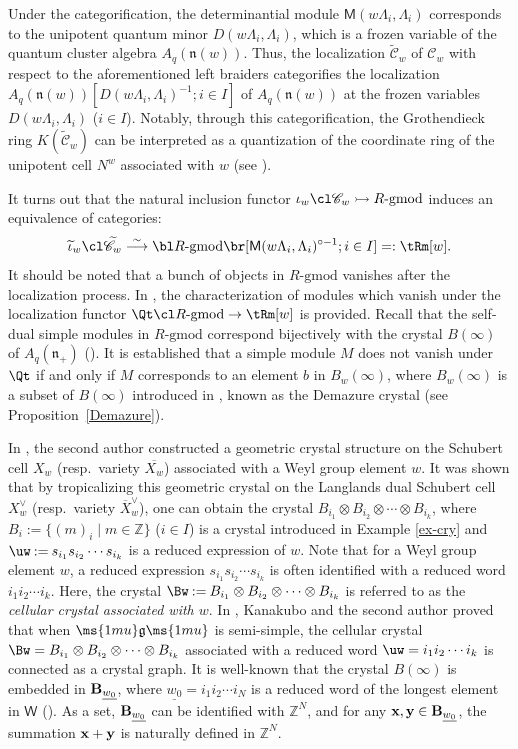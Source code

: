 \documentclass[12pt,leqno]{amsart}%
\theoremstyle{plain}
\theoremstyle{definition}
\newcommand{\seteq}{\mathbin{:=}}
\newcommand{\g}{\ms{1mu}\mathfrak{g}\ms{1mu}}
\newcommand{\n}{\mathfrak{n}}
\newcommand{\gmod}{\text{-}\mathrm{gmod}}
\newcommand{\weyl}{\mathsf{W}}  %
\newcommand\Aq[1][{\g^+}]{A_q(#1)}
\newcommand{\catC}{ \mathscr{C}}  	%
\newcommand{\tcatC}{ \widetilde{\mathscr{C}}}  	%
\newcommand{\dM}{ \mathsf{M }}              %
\newcommand{\La}{\Lambda} 			%
\newcommand{\bbZ}{\mathbb Z}
\numberwithin{equation}{section}
\begin{document}
Under the categorification, the determinantial module $\dM(w\La_i, \La_i)$ corresponds to the unipotent quantum minor $D(w\La_i, \La_i)$, which is a frozen variable of the quantum cluster algebra $A_q(\n(w))$. Thus, the localization $\tcatC_w$ of $\catC_w$ with respect to the aforementioned left braiders categorifies the localization $A_q(\n(w))[D(w\La_i, \La_i)^{-1}; i \in I]$ of $A_q(\n(w))$ at the frozen variables $D(w\La_i, \La_i)$ ($i \in I$). Notably, through this categorification, the Grothendieck ring $K(\tcatC_w)$ can be interpreted as a quantization of the coordinate ring of the unipotent cell $N^w$ associated with $w$ (see \cite[Theorem 4.13]{KO21}).

It turns out that the natural inclusion functor $\iota_w \cl \catC_w \rightarrowtail R\gmod$ induces an equivalence of categories:
$$
\widetilde \iota_w \cl  \tcatC_w \buildrel \sim \over \longrightarrow \bl R\gmod \br[\dM(w\La_i,\La_i)^{\circ -1}; i\in I]=:\tRm[w].
$$ 
It should be noted 
that a bunch of objects in $R\gmod$ vanishes after the localization process. 
In \cite[Proposition~3.3]{KKOP22},
the characterization of modules which vanish under the localization functor $\Qt \cl R\gmod \to \tRm[w]$ is provided. Recall that the self-dual simple modules in $R\gmod$ correspond bijectively with the crystal $B(\infty)$ of $\Aq[\n_+]$ (\cite{LV11}). It is established that a simple module $M$ does not vanish under $\Qt$ if and only if $M$ corresponds to an element $b$ in $B_w(\infty)$, where $B_w(\infty)$ is a subset of $B(\infty)$ introduced in \cite{Kas93}, known as the Demazure crystal (see Proposition~\ref{Demazure}).

In \cite{N1}, the second author constructed a geometric crystal structure on the Schubert cell $X_w$ 
(resp.\ variety $\overline{X_w}$) associated with a Weyl group element $w$. 
It was shown that by tropicalizing this geometric crystal on the Langlands dual Schubert cell $X^\vee_w$
(resp.\ variety $\overline{X}^\vee_w$), 
one can obtain the crystal $B_{i_1} \otimes B_{i_2} \otimes \cdots \otimes B_{i_k}$, 
where $B_i \seteq \{(m)_i \mid m \in \bbZ\}$ ($i \in I$) is a crystal introduced in Example \ref{ex-cry} 
and $\uw \seteq s_{i_1}s_{i_2} \cdots s_{i_k}$ is a reduced expression of $w$. 
Note that for a Weyl group element $w$, 
a reduced expression $s_{i_1}s_{i_2} \cdots s_{i_k}$ is often identified with a reduced word $i_1i_2 \cdots i_k$. Here, the crystal $\Bw \seteq B_{i_1} \otimes B_{i_2} \otimes \cdots \otimes B_{i_k}$ is 
referred to as the {\it cellular crystal associated with $w$}.
In \cite{Kana-N}, Kanakubo and the second author proved that when $\g$ is semi-simple, 
the cellular crystal $\Bw = B_{i_1} \otimes B_{i_2} \otimes \cdots \otimes B_{i_k}$ 
associated with a reduced word $\uw = i_1i_2 \cdots i_k$ is connected as a crystal graph. It is well-known
 that the crystal $B(\infty)$ is embedded in ${\bf B}_{\underline{w_0}}$, 
where $\underline{w_0} = i_1i_2 \cdots i_N$ is a reduced word of the longest element in $\weyl$ (\cite{Kana-N,N4}). 
As a set, ${\bf B}_{\underline{w_0}}$ can be identified with $\bbZ^N$, and for any ${\bf x, \bf y} \in {\bf B}_{\underline{w_0}}$, the summation ${\bf x} + {\bf y}$ is naturally defined in $\bbZ^N$.
\end{document}
